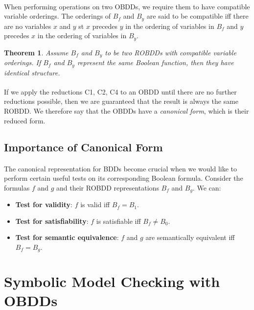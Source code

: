 \documentclass{article}
\theoremstyle{plain}
\newtheorem{thm}{Theorem}[section]
\theoremstyle{definition}
\begin{document}
\begin{multicols}{2}
\paragraph{} When performing operations on two OBDDs, we require them to have compatible variable orderings. The orderings of $B_f$ and $B_y$ are said to be compatible iff there are no variables $x$ and $y$ st $x$ precedes $y$ in the ordering of variables in $B_f$ and $y$ precedes $x$ in the ordering of variables in $B_y$.

\begin{thm}
Assume $B_f$ and $B_y$ to be two ROBDDs with compatible variable orderings. If $B_f$ and $B_y$ represent the same Boolean function, then they have identical structure.
\end{thm}

\paragraph{} If we apply the reductions C1, C2, C4 to an OBDD until there are no further reductions possible, then we are guaranteed that the result is always the same ROBDD. We therefore say that the OBDDs have a \textit{canonical form}, which is their reduced form.

\subsection{Importance of Canonical Form}

\paragraph{} The canonical representation for BDDs become crucial when we would like to perform certain useful tests on its corresponding Boolean formula. Consider the formulas $f$ and $g$ and their ROBDD representations $B_f$ and $B_g$. We can:

\begin{itemize}
\item \textbf{Test for validity}: $f$ is valid iff $B_f = B_1$.
\item \textbf{Test for satisfiability}: $f$ is satisfiable iff $B_f \not= B_0$.
\item \textbf{Test for semantic equivalence}: $f$ and $g$ are semantically equivalent iff $B_f = B_g$.
\end{itemize}

\section{Symbolic Model Checking with OBDDs}


\end{multicols}
\end{document}
